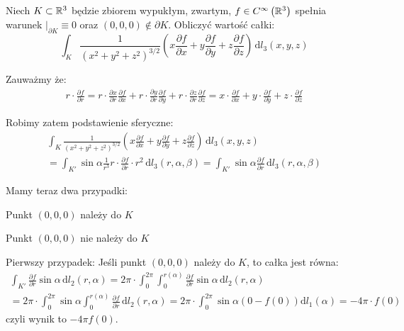 \documentclass[11pt]{scrartcl}
\begin{document}
    \begin{zadanie*}
        Niech $K \subset \mathbb R^3$ będzie zbiorem wypukłym, zwartym, $f \in C^\infty \left ( \mathbb R^3 \right )$ 
        spełnia warunek $\big|_{\partial K} \equiv 0$
        oraz $\left ( 0, 0, 0 \right ) \not \in \partial K$. Obliczyć wartość całki:
        \[
            \int_K \frac{1}{(x^2 + y^2 + z^2)^{3/2}} 
            \left( x \frac{\partial f}{\partial x} 
            + y \frac{\partial f}{\partial y} 
            + z \frac{\partial f}{\partial z} \right) 
            \, \mathrm{d} l_3 (x,y,z)
        \]
    \end{zadanie*}

    Zauważmy że:
    \begin{gather*}
        r \cdot \frac{\partial f}{\partial r} =
        r \cdot \frac{\partial x}{\partial r}  \frac{\partial f}{\partial x} +
        r \cdot \frac{\partial y}{\partial r}  \frac{\partial f}{\partial y} +  
        r \cdot \frac{\partial z}{\partial r}  \frac{\partial f}{\partial z} =
        x \cdot \frac{\partial f}{\partial x} +
        y \cdot \frac{\partial f}{\partial y} +  
        z \cdot \frac{\partial f}{\partial z}
    \end{gather*}
   
    Robimy zatem podstawienie sferyczne:
    \begin{gather*}
            \int_K \frac{1}{(x^2 + y^2 + z^2)^{3/2}} 
            \left( x \frac{\partial f}{\partial x} 
            + y \frac{\partial f}{\partial y} 
            + z \frac{\partial f}{\partial z} \right) 
            \, \mathrm{d} l_3 (x,y,z) \\
            = \int_{K'} \sin \alpha \frac{1}{r^3} r \cdot \frac{\partial f}{\partial r} \cdot r^2
            \, \mathrm{d} l_3 (r,\alpha , \beta ) 
            = \int_{K'} \sin \alpha  \frac{\partial f}{\partial r} \, \mathrm{d} l_3 (r,\alpha , \beta )
    \end{gather*}

    Mamy teraz dwa przypadki:
    \begin{walk}
        \item Punkt $(0, 0, 0)$ należy do $K$
        \item Punkt $(0, 0, 0)$ nie należy do $K$
    \end{walk}

    Pierwszy przypadek:
    Jeśli punkt $(0, 0, 0)$ należy do $K$, to całka jest równa:
    \begin{gather*}
        \int_{K'} \frac{\partial f}{\partial r} \sin \alpha \, \mathrm{d} l_2 (r,\alpha ) 
        = 2 \pi \cdot \int_0^{2\pi} \int_0^{r(\alpha)} \frac{\partial f}{\partial r} \sin \alpha  \, \mathrm{d} l_2 (r,\alpha ) \\ 
        = 2 \pi \cdot \int_0^{2\pi} \sin \alpha \int_0^{r(\alpha)} \frac{\partial f}{\partial r} \, \mathrm{d} l_2 (r,\alpha ) 
        = 2 \pi \cdot \int_0^{2\pi} \sin \alpha \left ( 0 - f(0) \right ) \mathrm{d} l_1 (\alpha) 
        = - 4 \pi \cdot f(0)
    \end{gather*}
    czyli wynik to $- 4 \pi f(0)$.
\end{document}
